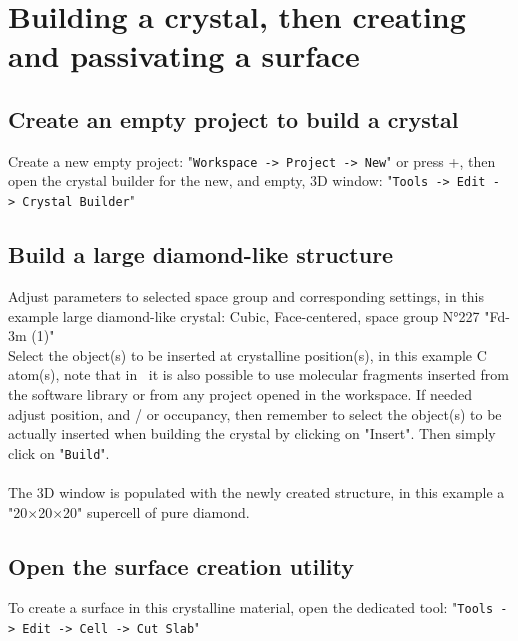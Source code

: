 \chapter{Building a crystal, then creating and passivating a surface}
\label{tuto-10}

\section{Create an empty project to build a crystal}

Create a new empty project: "\texttt{Workspace~->~Project~->~New}" or press \Ctrl+, then open the crystal builder for the new, and empty, 3D window: "\texttt{Tools~->~Edit~->~Crystal~Builder}" \\[0.5cm]

\clearpage

\section{Build a large diamond-like structure}

Adjust parameters to selected space group and corresponding settings, in this example large diamond-like crystal: Cubic, Face-centered, space group N°227 "Fd-3m (1)" \\ 
Select the object(s) to be inserted at crystalline position(s), in this example C atom(s), note that in \atomes\ it is also possible to use molecular fragments inserted from the software library or from any project opened in the workspace. 
If needed adjust position, and / or occupancy, then remember to select the object(s) to be actually inserted when building the crystal by clicking on "Insert". 
Then simply click on "\texttt{Build}". \\[0.5cm]
\\[0.5cm]
The 3D window is populated with the newly created structure, in this example a "20$\times$20$\times$20" supercell of pure diamond. 

\clearpage

\section{Open the surface creation utility}

To create a surface in this crystalline material, open the dedicated tool: "\texttt{Tools~->~Edit~->~Cell~->~Cut~Slab}" \\[0.5cm]

